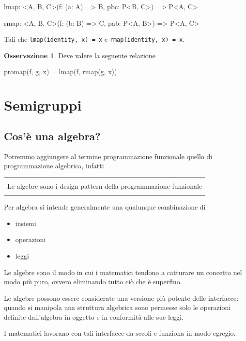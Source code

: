 \documentclass[12pt]{article}
\theoremstyle{definition}
\newtheorem{observation}{Osservazione}[section]
\newenvironment{demo}
    {\begin{center}
    \begin{tabular}{|p{0.9\textwidth}|}
    \hline\\
    }
    {
    \\\\\hline
    \end{tabular}
    \end{center}
    }
\newenvironment{code}
  {\vspace{0.5cm} \VerbatimEnvironment\begin{typescriptcode}}
  {\end{typescriptcode} \vspace{0.2cm}}
\begin{document}
\begin{code}
lmap: <A, B, C>(f: (a: A) => B, pbc: P<B, C>) => P<A, C>

rmap: <A, B, C>(f: (b: B) => C, pab: P<A, B>) => P<A, C>
\end{code}

Tali che \texttt{lmap(identity, x) = x} e \texttt{rmap(identity, x) = x}.

\begin{observation}
Deve valere la seguente relazione

\begin{code}
promap(f, g, x) = lmap(f, rmap(g, x))
\end{code}
\end{observation}

\newpage

\section{Semigruppi}

\subsection{Cos'è una algebra?}

Potremmo aggiungere al termine programmazione funzionale quello di programmazione algebrica, infatti

\begin{demo}
Le algebre sono i design pattern della programmazione funzionale
\end{demo}

Per algebra si intende generalmente una qualunque combinazione di

\begin{itemize}
  \item insiemi
  \item operazioni
  \item leggi
\end{itemize}

Le algebre sono il modo in cui i matematici tendono a catturare un concetto nel modo più puro,
ovvero eliminando tutto ciò che è superfluo.

Le algebre possono essere considerate una versione più potente delle interfacce: quando si manipola una struttura algebrica
sono permesse solo le operazioni definite dall'algebra in oggetto e in conformità alle sue leggi.

I matematici lavorano con tali interfacce da secoli e funziona in modo egregio.
\end{document}
